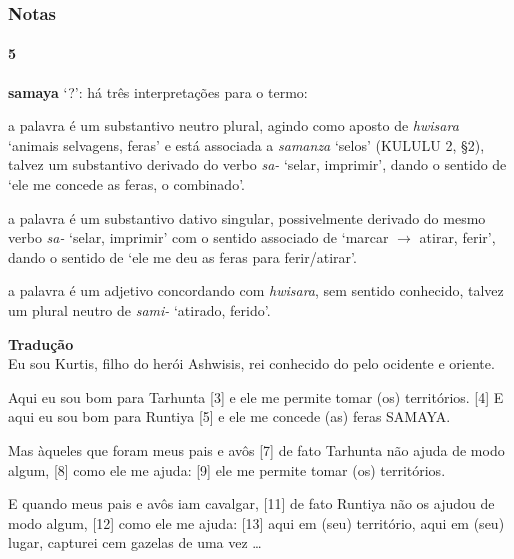 \subsubsection*{Notas}

\paragraph{5}
\textbf{samaya} `?': há três interpretações para o termo:
\begin{inparaenum}
	\item a palavra é um substantivo neutro plural, agindo como aposto de
	\emph{hwisara} `animais selvagens, feras' e está associada a
	\emph{samanza} `selos' (KULULU 2, §2), talvez um substantivo derivado do
	verbo \emph{sa-} `selar, imprimir',
	dando o sentido de `ele me concede as feras, o combinado'.
	\item a palavra é um substantivo dativo singular, possivelmente derivado do
	mesmo verbo \emph{sa-} `selar, imprimir' com o sentido associado de
	`marcar $\rightarrow$ atirar, ferir', dando o sentido de `ele me deu as
	feras para ferir\slash{}atirar'.
	\item a palavra é um adjetivo concordando com \emph{hwisara}, sem sentido
	conhecido, talvez um plural neutro de \emph{sami-} `atirado, ferido'.
\end{inparaenum}

\bigskip
\noindent \textbf{Tradução}\\
\noindent [1] Eu sou Kurtis, filho do herói Ashwisis, rei conhecido do
pelo ocidente e oriente.

\noindent [2] Aqui eu sou bom para Tarhunta [3] e ele me
permite tomar (os) territórios.
[4] E aqui eu sou bom para Runtiya [5] e ele me concede (as) feras SAMAYA\@.

\noindent [6] Mas àqueles que foram meus pais e avôs [7] de fato Tarhunta não
ajuda de modo algum, [8] como ele me ajuda: [9] ele me permite tomar (os)
territórios.

\noindent [10] E quando meus pais e avôs iam cavalgar, [11] de fato Runtiya não
os ajudou de modo algum, [12] como ele me ajuda: [13] aqui em (seu) território,
aqui em (seu) lugar, capturei cem gazelas de uma vez \ldots

